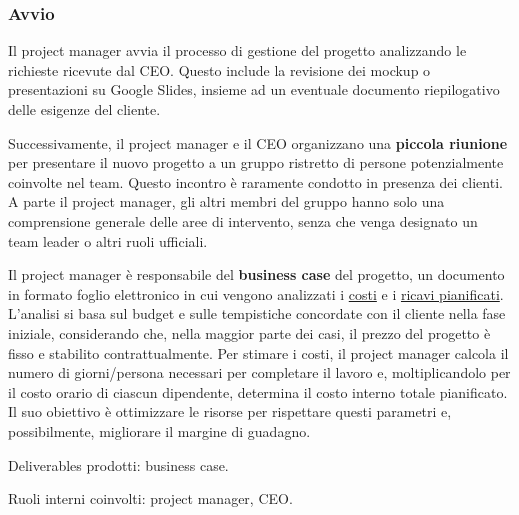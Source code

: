         \subsubsection{Avvio}
        Il project manager avvia il processo di gestione del progetto analizzando le richieste ricevute dal CEO. Questo include la
        revisione dei mockup o presentazioni su Google Slides, insieme ad un eventuale documento riepilogativo delle esigenze del cliente.

        Successivamente, il project manager e il CEO organizzano una \textbf{piccola riunione} per presentare il nuovo progetto a un gruppo
        ristretto di persone potenzialmente coinvolte nel team. Questo incontro è raramente condotto in presenza dei clienti. A parte
        il project manager, gli altri membri del gruppo hanno solo una comprensione generale delle aree di intervento, senza che venga designato un team leader o altri ruoli ufficiali.

        Il project manager è responsabile del \textbf{business case} del progetto, un documento in formato foglio elettronico in cui vengono analizzati i \underline{costi}
        e i \underline{ricavi pianificati}. L’analisi si basa sul budget e sulle tempistiche concordate con il cliente nella fase iniziale, considerando che,
        nella maggior parte dei casi, il prezzo del progetto è fisso e stabilito contrattualmente. Per stimare i costi, il project manager calcola il numero di giorni/persona necessari
        per completare il lavoro e, moltiplicandolo per il costo orario di ciascun dipendente, determina il costo interno totale pianificato.
        Il suo obiettivo è ottimizzare le risorse per rispettare questi parametri e, possibilmente, migliorare il margine di guadagno.

        Deliverables prodotti: business case.

        Ruoli interni coinvolti: project manager, CEO.

